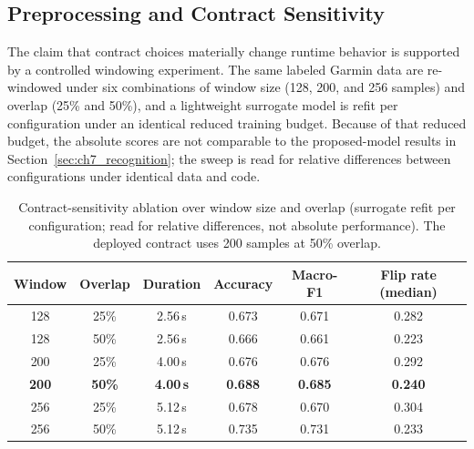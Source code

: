 \subsection{Preprocessing and Contract Sensitivity}
\label{sec:ch7_ablation}

The claim that contract choices materially change runtime behavior is supported by a controlled windowing experiment. The same labeled Garmin data are re-windowed under six combinations of window size (128, 200, and 256 samples) and overlap (25\% and 50\%), and a lightweight surrogate model is refit per configuration under an identical reduced training budget. Because of that reduced budget, the absolute scores are not comparable to the proposed-model results in Section~\ref{sec:ch7_recognition}; the sweep is read for relative differences between configurations under identical data and code.

\renewcommand{\arraystretch}{1.2}
\begin{table}[htbp]
\centering
\footnotesize
\caption[Contract-sensitivity ablation over window size and overlap...]{Contract-sensitivity ablation over window size and overlap (surrogate refit per configuration; read for relative differences, not absolute performance). The deployed contract uses 200 samples at 50\% overlap.}
\label{tab:ch7_ablation}
\begin{tabular}{cccccc}
\toprule
\textbf{Window} & \textbf{Overlap} & \textbf{Duration} & \textbf{Accuracy} & \textbf{Macro-F1} & \textbf{Flip rate (median)} \\
\midrule
128 & 25\% & 2.56\,s & 0.673 & 0.671 & 0.282 \\
128 & 50\% & 2.56\,s & 0.666 & 0.661 & 0.223 \\
200 & 25\% & 4.00\,s & 0.676 & 0.676 & 0.292 \\
\textbf{200} & \textbf{50\%} & \textbf{4.00\,s} & \textbf{0.688} & \textbf{0.685} & \textbf{0.240} \\
256 & 25\% & 5.12\,s & 0.678 & 0.670 & 0.304 \\
256 & 50\% & 5.12\,s & 0.735 & 0.731 & 0.233 \\
\bottomrule
\end{tabular}
\renewcommand{\arraystretch}{1.0}
\end{table}
\FloatBarrier

